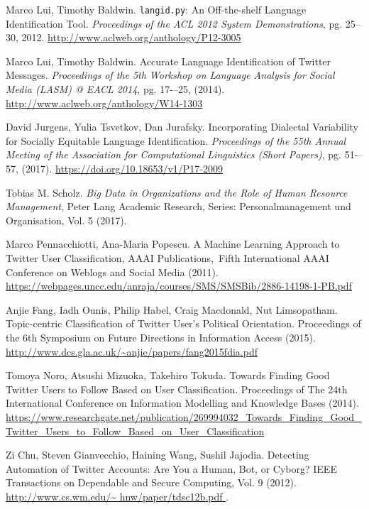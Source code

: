 \begin{thebibliography}{3}
 Marco Lui, Timothy Baldwin. {\tt langid.py}: An Off-the-shelf Language Identification Tool.
{\em Proceedings of the ACL 2012 System Demonstrations}, pg. 25--30, 2012.
\url{http://www.aclweb.org/anthology/P12-3005}

 Marco Lui, Timothy Baldwin. Accurate Language Identification of Twitter Messages. 
{\em Proceedings of the 5th Workshop on Language Analysis for Social Media (LASM) @ EACL 2014}, pg. 17-–25,
(2014). \url{http://www.aclweb.org/anthology/W14-1303}

 David Jurgens, Yulia Tsvetkov, Dan Jurafsky. Incorporating Dialectal Variability
for Socially Equitable Language Identification. 
{\em Proceedings of the 55th Annual Meeting of the Association for Computational Linguistics (Short Papers)}, 
pg. 51-–57, (2017). \url{https://doi.org/10.18653/v1/P17-2009}

 Tobias M. Scholz. {\em Big Data in Organizations and the Role of
Human Resource Management}, Peter Lang Academic Research, Series: Personalmanagement und
Organisation, Vol. 5 (2017).

Marco Pennacchiotti, Ana-Maria Popescu. A Machine Learning Approach to Twitter User Classification, AAAI Publications, Fifth International AAAI Conference on Weblogs and Social Media (2011).
\url{https://webpages.uncc.edu/anraja/courses/SMS/SMSBib/2886-14198-1-PB.pdf }

 Anjie Fang, Iadh Ounis, Philip Habel, Craig Macdonald, Nut Limsopatham.
Topic-centric Classification of Twitter User’s Political Orientation. Proceedings of the 
6th Symposium on Future Directions in Information Access (2015).
\url{http://www.dcs.gla.ac.uk/~anjie/papers/fang2015fdia.pdf }

 Tomoya Noro, Atsushi Mizuoka, Takehiro Tokuda. 
Towards Finding Good Twitter Users to Follow Based on User Classification.
Proceedings of The 24th International Conference on Information Modelling and Knowledge 
Bases (2014). \url{https://www.researchgate.net/publication/269994032_Towards_Finding_Good_Twitter_Users_to_Follow_Based_on_User_Classification }

 Zi Chu, Steven Gianvecchio, Haining Wang, Sushil Jajodia. 
Detecting Automation of Twitter Accounts: Are You a Human, Bot, or Cyborg?
IEEE Transactions on Dependable and Secure Computing, Vol. 9 (2012).
\url{http://www.cs.wm.edu/\~ hnw/paper/tdsc12b.pdf }.


\end{thebibliography}
